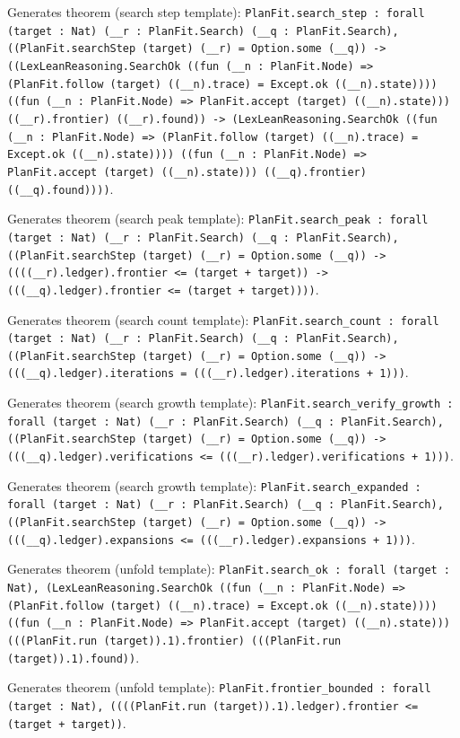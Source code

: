 \documentclass[11pt]{article}
\begin{document}
\noindent Generates theorem (search step template): \texttt{PlanFit.search\_step : forall (target : Nat) (\_\_r : PlanFit.Search) (\_\_q : PlanFit.Search), ((PlanFit.searchStep (target) (\_\_r) = Option.some (\_\_q)) -> ((LexLeanReasoning.SearchOk ((fun (\_\_n : PlanFit.Node) => (PlanFit.follow (target) ((\_\_n).trace) = Except.ok ((\_\_n).state)))) ((fun (\_\_n : PlanFit.Node) => PlanFit.accept (target) ((\_\_n).state))) ((\_\_r).frontier) ((\_\_r).found)) -> (LexLeanReasoning.SearchOk ((fun (\_\_n : PlanFit.Node) => (PlanFit.follow (target) ((\_\_n).trace) = Except.ok ((\_\_n).state)))) ((fun (\_\_n : PlanFit.Node) => PlanFit.accept (target) ((\_\_n).state))) ((\_\_q).frontier) ((\_\_q).found))))}.\par
\noindent Generates theorem (search peak template): \texttt{PlanFit.search\_peak : forall (target : Nat) (\_\_r : PlanFit.Search) (\_\_q : PlanFit.Search), ((PlanFit.searchStep (target) (\_\_r) = Option.some (\_\_q)) -> ((((\_\_r).ledger).frontier <= (target + target)) -> (((\_\_q).ledger).frontier <= (target + target))))}.\par
\noindent Generates theorem (search count template): \texttt{PlanFit.search\_count : forall (target : Nat) (\_\_r : PlanFit.Search) (\_\_q : PlanFit.Search), ((PlanFit.searchStep (target) (\_\_r) = Option.some (\_\_q)) -> (((\_\_q).ledger).iterations = (((\_\_r).ledger).iterations + 1)))}.\par
\noindent Generates theorem (search growth template): \texttt{PlanFit.search\_verify\_growth : forall (target : Nat) (\_\_r : PlanFit.Search) (\_\_q : PlanFit.Search), ((PlanFit.searchStep (target) (\_\_r) = Option.some (\_\_q)) -> (((\_\_q).ledger).verifications <= (((\_\_r).ledger).verifications + 1)))}.\par
\noindent Generates theorem (search growth template): \texttt{PlanFit.search\_expanded : forall (target : Nat) (\_\_r : PlanFit.Search) (\_\_q : PlanFit.Search), ((PlanFit.searchStep (target) (\_\_r) = Option.some (\_\_q)) -> (((\_\_q).ledger).expansions <= (((\_\_r).ledger).expansions + 1)))}.\par
\noindent Generates theorem (unfold template): \texttt{PlanFit.search\_ok : forall (target : Nat), (LexLeanReasoning.SearchOk ((fun (\_\_n : PlanFit.Node) => (PlanFit.follow (target) ((\_\_n).trace) = Except.ok ((\_\_n).state)))) ((fun (\_\_n : PlanFit.Node) => PlanFit.accept (target) ((\_\_n).state))) (((PlanFit.run (target)).1).frontier) (((PlanFit.run (target)).1).found))}.\par
\noindent Generates theorem (unfold template): \texttt{PlanFit.frontier\_bounded : forall (target : Nat), ((((PlanFit.run (target)).1).ledger).frontier <= (target + target))}.\par
\end{document}
